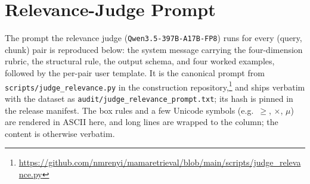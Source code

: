 \section{Relevance-Judge Prompt}
\label{app:judge-prompt}

The prompt the relevance judge (\texttt{Qwen3.5-397B-A17B-FP8}) runs for every
(query, chunk) pair is reproduced below: the system message carrying the
four-dimension rubric, the structural rule, the output schema, and four worked
examples, followed by the per-pair user template. It is the canonical prompt
from \texttt{scripts/judge\_relevance.py} in the construction
repository,\footnote{\url{https://github.com/nmrenyi/mamaretrieval/blob/main/scripts/judge_relevance.py}}
and ships verbatim with the dataset as
\texttt{audit/judge\_relevance\_prompt.txt}; its hash is pinned in the release
manifest. The box rules and a few Unicode symbols (e.g.\ $\ge$, $\times$,
$\mu$) are rendered in ASCII here, and long lines are wrapped to the column;
the content is otherwise verbatim.


